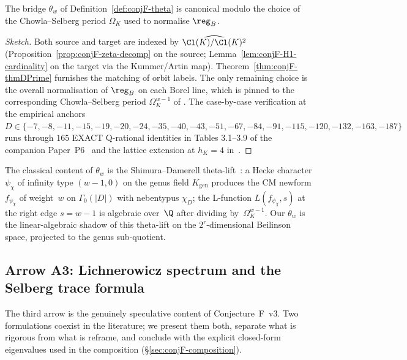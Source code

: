 \begin{proposition}\label{prop:conjF-theta-canonical}
The bridge $\theta_w$ of Definition~\ref{def:conjF-theta} is canonical
modulo the choice of the Chowla--Selberg period
$\Omega_K$ used to normalise $\reg_B$.
\end{proposition}

\begin{proof}[Sketch]
Both source and target are indexed by
$\widehat{\Cl(K)/\Cl(K)^2}$ (Proposition~\ref{prop:conjF-zeta-decomp}
on the source; Lemma~\ref{lem:conjF-H1-cardinality} on the target via
the Kummer/Artin map).  Theorem~\ref{thm:conjF-thmDPrime} furnishes
the matching of orbit labels.  The only remaining choice is the
overall normalisation of $\reg_B$ on each Borel line, which is pinned
to the corresponding Chowla--Selberg period
$\Omega_K^{w-1}$ of \cite{ChowlaSelberg1949}.
The case-by-case verification at the empirical anchors $D \in
\{-7, -8, -11, -15, -19, -20, -24, -35, -40, -43, -51, -67, -84,
-91, -115, -120, -132, -163, -187\}$ runs through $165$ EXACT
Q-rational identities in Tables 3.1--3.9 of the companion
Paper~P6~\cite{Remondiere2026P6} and the lattice extension at
$h_K = 4$ in~\cite[\S5]{Remondiere2026P5}.
\end{proof}

\begin{remark}\label{rk:conjF-theta-shimura}
The classical content of $\theta_w$ is the Shimura--Damerell
theta-lift~\cite{Shimura1976,Damerell1971}: a Hecke character
$\psi_\chi$ of infinity type $(w-1, 0)$ on the genus field
$K_{\mathrm{gen}}$ produces the CM newform $f_{\psi_\chi}$ of
weight~$w$ on $\Gamma_0(|D|)$ with nebentypus $\chi_D$; the
L-function $L(f_{\psi_\chi}, s)$ at the right edge $s = w - 1$ is
algebraic over~$\Q$ after dividing by~$\Omega_K^{w-1}$.  Our
$\theta_w$ is the linear-algebraic shadow of this theta-lift on the
$2^r$-dimensional Beilinson space, projected to the genus
sub-quotient.
\end{remark}

\subsection{Arrow A3: Lichnerowicz spectrum and the Selberg trace formula}
\label{sec:conjF-lich}

The third arrow is the genuinely speculative content of
Conjecture~F~v3.  Two formulations coexist in the literature; we
present them both, separate what is rigorous from what is reframe,
and conclude with the explicit closed-form eigenvalues used in the
composition (\S\ref{sec:conjF-composition}).

